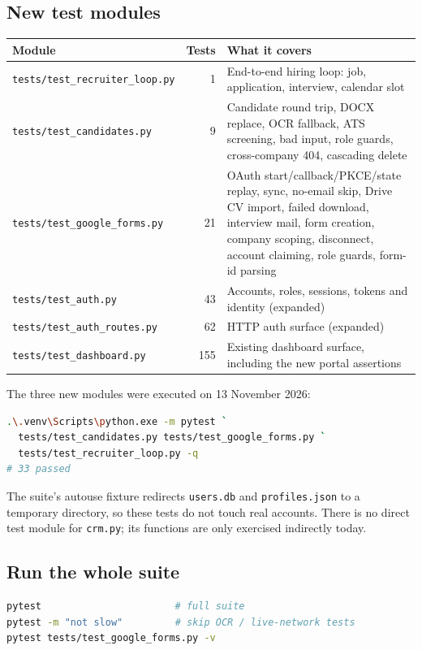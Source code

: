 \documentclass[11pt,a4paper]{article}
\newcommand{\file}[1]{\texttt{\small #1}}
\begin{document}
\subsection{New test modules}
\begin{center}
\begin{tabular}{@{}lrl@{}}
\toprule
\textbf{Module} & \textbf{Tests} & \textbf{What it covers}\\
\midrule
\file{tests/test\_recruiter\_loop.py} & 1 &
  End-to-end hiring loop: job, application, interview, calendar slot\\
\file{tests/test\_candidates.py} & 9 &
  Candidate round trip, DOCX replace, OCR fallback, ATS screening, bad input,
  role guards, cross-company 404, cascading delete\\
\file{tests/test\_google\_forms.py} & 21 &
  OAuth start/callback/PKCE/state replay, sync, no-email skip, Drive CV
  import, failed download, interview mail, form creation, company scoping,
  disconnect, account claiming, role guards, form-id parsing\\
\file{tests/test\_auth.py} & 43 &
  Accounts, roles, sessions, tokens and identity (expanded)\\
\file{tests/test\_auth\_routes.py} & 62 &
  HTTP auth surface (expanded)\\
\file{tests/test\_dashboard.py} & 155 &
  Existing dashboard surface, including the new portal assertions\\
\bottomrule
\end{tabular}
\end{center}

The three new modules were executed on 13 November 2026:

\begin{lstlisting}[language=bash]
.\.venv\Scripts\python.exe -m pytest `
  tests/test_candidates.py tests/test_google_forms.py `
  tests/test_recruiter_loop.py -q
# 33 passed
\end{lstlisting}

The suite's autouse fixture redirects \file{users.db} and
\file{profiles.json} to a temporary directory, so these tests do not touch
real accounts. There is no direct test module for \file{crm.py}; its functions
are only exercised indirectly today.

\subsection{Run the whole suite}
\begin{lstlisting}[language=bash]
pytest                       # full suite
pytest -m "not slow"         # skip OCR / live-network tests
pytest tests/test_google_forms.py -v
\end{lstlisting}
\end{document}
